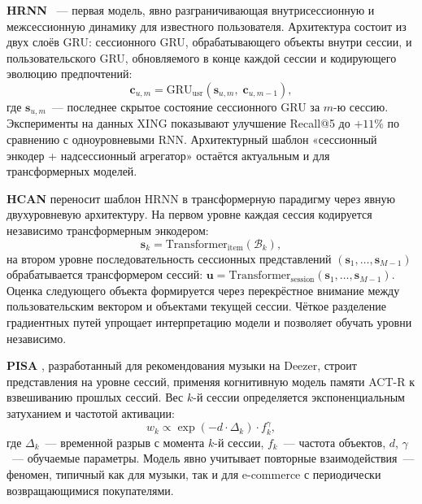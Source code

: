 \textbf{HRNN} \cite{quadrana2017hrnn}~--- первая модель, явно разграничивающая внутрисессионную и межсессионную динамику для известного пользователя. 
Архитектура состоит из двух слоёв GRU: сессионного GRU, обрабатывающего объекты внутри сессии, и пользовательского GRU, обновляемого в конце каждой сессии и кодирующего эволюцию предпочтений:
\begin{equation}
    \mathbf{c}_{u,m} = \mathrm{GRU}_\text{usr}\!\left(\mathbf{s}_{u,m},\; \mathbf{c}_{u,m-1}\right),
\end{equation}
где $\mathbf{s}_{u,m}$~--- последнее скрытое состояние сессионного GRU за $m$-ю сессию. 
Эксперименты на данных XING показывают улучшение Recall@5 до $+11\%$ по сравнению с одноуровневыми RNN. Архитектурный шаблон «сессионный энкодер + надсессионный агрегатор» остаётся актуальным и для трансформерных моделей.

\textbf{HCAN} \cite{cui2019hierarchical} переносит шаблон HRNN в трансформерную парадигму через явную двухуровневую архитектуру.
На первом уровне каждая сессия кодируется независимо трансформерным энкодером:
\begin{equation}
    \mathbf{s}_k = \mathrm{Transformer}_\text{item}\!\left(\mathcal{B}_k\right),
\end{equation}
на втором уровне последовательность сессионных представлений $(\mathbf{s}_1, \ldots, \mathbf{s}_{M-1})$ обрабатывается трансформером сессий: $\mathbf{u} = \mathrm{Transformer}_\text{session}(\mathbf{s}_1, \ldots, \mathbf{s}_{M-1})$. 
Оценка следующего объекта формируется через перекрёстное внимание между пользовательским вектором и объектами текущей сессии. 
Чёткое разделение градиентных путей упрощает интерпретацию модели и позволяет обучать уровни независимо.

\textbf{PISA} \cite{tran2024pisa}, разработанный для рекомендования музыки на Deezer, строит представления на уровне сессий, применяя когнитивную модель памяти ACT-R к взвешиванию прошлых сессий. 
Вес $k$-й сессии определяется экспоненциальным затуханием и частотой активации:
\begin{equation}
    w_k \propto \exp(-d \cdot \Delta_k) \cdot f_k^\gamma,
\end{equation}
где $\Delta_k$~--- временной разрыв с момента $k$-й сессии, $f_k$~--- частота объектов, $d$, $\gamma$~--- обучаемые параметры. 
Модель явно учитывает повторные взаимодействия~--- феномен, типичный как для музыки, так и для e-commerce с периодически возвращающимися покупателями.

